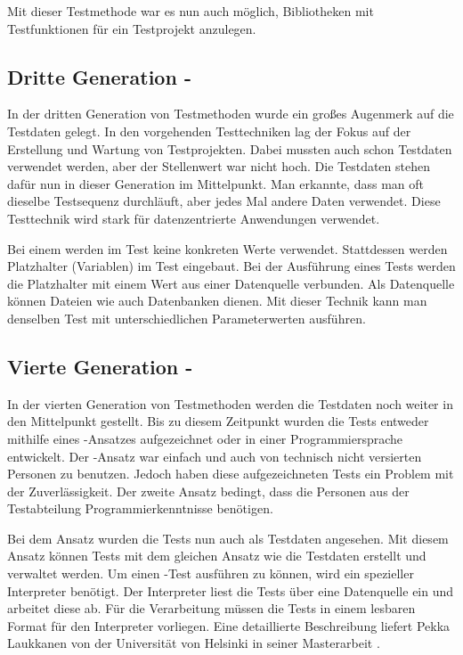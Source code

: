 \SuperPar
Mit dieser Testmethode war es nun auch möglich, Bibliotheken mit Testfunktionen für ein Testprojekt anzulegen. 

\subsection{Dritte Generation - }

In der dritten Generation von Testmethoden wurde ein großes Augenmerk auf die Testdaten gelegt. In den vorgehenden Testtechniken lag der Fokus auf der Erstellung und Wartung von Testprojekten. Dabei mussten auch schon Testdaten verwendet werden, aber der Stellenwert war nicht hoch. Die Testdaten stehen dafür nun in dieser Generation im Mittelpunkt. Man erkannte, dass man oft dieselbe Testsequenz durchläuft, aber jedes Mal andere Daten verwendet. Diese Testtechnik wird stark für datenzentrierte Anwendungen verwendet. 

\SuperPar
Bei einem  werden im Test keine konkreten Werte verwendet. Stattdessen werden Platzhalter (Variablen) im Test eingebaut. Bei der Ausführung eines Tests werden die Platzhalter mit einem Wert aus einer Datenquelle verbunden. Als Datenquelle können Dateien wie auch Datenbanken dienen. Mit dieser Technik kann man denselben Test mit unterschiedlichen Parameterwerten ausführen. 

\subsection{Vierte Generation - }

In der vierten Generation von Testmethoden werden die Testdaten noch weiter in den Mittelpunkt gestellt. Bis zu diesem Zeitpunkt wurden die Tests entweder mithilfe eines -Ansatzes aufgezeichnet oder in einer Programmiersprache entwickelt. Der -Ansatz war einfach und auch von technisch nicht versierten Personen zu benutzen. Jedoch haben diese aufgezeichneten Tests ein Problem mit der Zuverlässigkeit. Der zweite Ansatz bedingt, dass die Personen aus der Testabteilung Programmierkenntnisse benötigen.

\SuperPar
Bei dem Ansatz  wurden die Tests nun auch als Testdaten angesehen. Mit diesem Ansatz können Tests mit dem gleichen Ansatz wie die Testdaten erstellt und verwaltet werden. Um einen -Test ausführen zu können, wird ein spezieller Interpreter benötigt. Der Interpreter liest die Tests über eine Datenquelle ein und arbeitet diese ab. Für die Verarbeitung müssen die Tests in einem lesbaren Format für den Interpreter vorliegen. Eine detaillierte Beschreibung liefert Pekka Laukkanen von der Universität von Helsinki in seiner Masterarbeit \cite{Lauk06}. 

